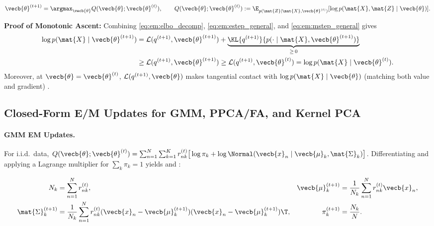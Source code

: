 \documentclass[../../../../master.tex]{subfiles}
\begin{document}
\begin{coremath}
\begin{itemize}
  \begin{equation}
    \vecb{\theta}^{(t+1)} = \argmax_{\vecb{\theta}} Q(\vecb{\theta}; \vecb{\theta}^{(t)}), \qquad Q(\vecb{\theta}; \vecb{\theta}^{(t)}) := \E_{p(\mat{Z} \mid \mat{X}, \vecb{\theta}^{(t)})}[\log p(\mat{X}, \mat{Z} \mid \vecb{\theta})].
    \label{eq:em:mstep_general}
  \end{equation}
\end{itemize}
\textbf{Proof of Monotonic Ascent:} Combining \eqref{eq:em:elbo_decomp}, \eqref{eq:em:estep_general}, and \eqref{eq:em:mstep_general} gives
\begin{align}
  \log p(\mat{X} \mid \vecb{\theta}^{(t+1)}) &= \mathcal{L}(q^{(t+1)}, \vecb{\theta}^{(t+1)}) + \underbrace{\KL{q^{(t+1)}}{p(\cdot \mid \mat{X}, \vecb{\theta}^{(t+1)})}}_{\ge\, 0} \nonumber \\
  &\ge \mathcal{L}(q^{(t+1)}, \vecb{\theta}^{(t+1)}) \ge \mathcal{L}(q^{(t+1)}, \vecb{\theta}^{(t)}) = \log p(\mat{X} \mid \vecb{\theta}^{(t)}).
  \label{eq:em:monotone_chain}
\end{align}
Moreover, at $\vecb{\theta} = \vecb{\theta}^{(t)}$, $\mathcal{L}(q^{(t+1)}, \vecb{\theta})$ makes tangential contact with $\log p(\mat{X} \mid \vecb{\theta})$ (matching both value and gradient) .
\end{coremath}

\subsection{Closed-Form E/M Updates for GMM, PPCA/FA, and Kernel PCA}
\label{subsec:em:closed_forms}

{\sloppy
\paragraph{GMM EM Updates.} For i.i.d.\ data, $Q(\vecb{\theta};\vecb{\theta}^{(t)}) = \sum_{n=1}^N \sum_{k=1}^K r_{nk}^{(t)} \big[\log \pi_k + \log \Normal(\vecb{x}_n \mid \vecb{\mu}_k, \mat{\Sigma}_k)\big]$. Differentiating and applying a Lagrange multiplier for $\sum_k \pi_k = 1$ yields  and :
\par}
\begin{align}
  N_k &= \sum_{n=1}^N r_{nk}^{(t)}, & \vecb{\mu}_k^{(t+1)} &= \frac{1}{N_k}\sum_{n=1}^N r_{nk}^{(t)} \vecb{x}_n, \nonumber \\
  \mat{\Sigma}_k^{(t+1)} &= \frac{1}{N_k}\sum_{n=1}^N r_{nk}^{(t)}(\vecb{x}_n - \vecb{\mu}_k^{(t+1)})(\vecb{x}_n - \vecb{\mu}_k^{(t+1)})\T, & \pi_k^{(t+1)} &= \frac{N_k}{N}.
  \label{eq:em:gmm_mstep}
\end{align}
\end{document}
